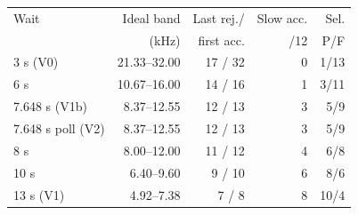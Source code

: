 \begin{tabular}{@{}lrrrr@{}}
\toprule
Wait & Ideal band & Last rej./ & Slow acc. & Sel.\\
 & (kHz) & first acc. & /12 & P/F\\
\midrule
3 s (V0) & 21.33--32.00 & 17 / 32 & 0 & 1/13\\
6 s & 10.67--16.00 & 14 / 16 & 1 & 3/11\\
7.648 s (V1b) & 8.37--12.55 & 12 / 13 & 3 & 5/9\\
7.648 s poll (V2) & 8.37--12.55 & 12 / 13 & 3 & 5/9\\
8 s & 8.00--12.00 & 11 / 12 & 4 & 6/8\\
10 s & 6.40--9.60 & 9 / 10 & 6 & 8/6\\
13 s (V1) & 4.92--7.38 & 7 / 8 & 8 & 10/4\\
\bottomrule
\end{tabular}
